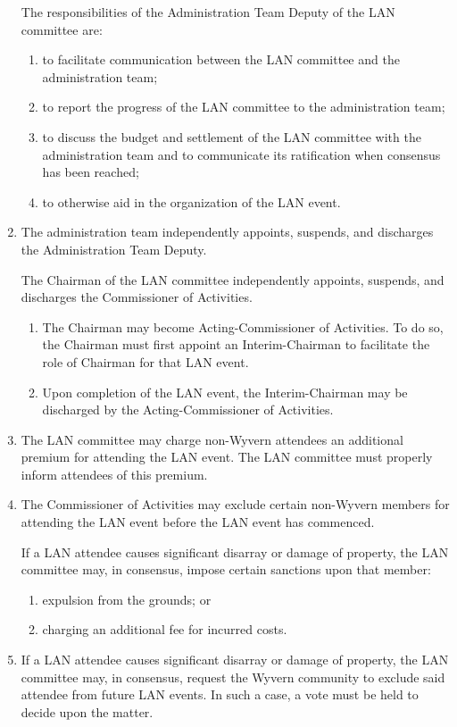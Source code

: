 \begin{enumerate}
    \begin{item}
        The responsibilities of the Administration Team Deputy of the LAN committee are:
        \begin{enumerate}
            \item to facilitate communication between the LAN committee and the administration team;
            \item to report the progress of the LAN committee to the administration team;
            \item to discuss the budget and settlement of the LAN committee with the administration team and to communicate its ratification when consensus has been reached;
            \item to otherwise aid in the organization of the LAN event.
        \end{enumerate}
    \end{item}

    \item The administration team independently appoints, suspends, and discharges the Administration Team Deputy.

    \begin{item}
        The Chairman of the LAN committee independently appoints, suspends, and discharges the Commissioner of Activities.
        \begin{enumerate}
            \item The Chairman may become Acting-Commissioner of Activities. To do so, the Chairman must first appoint an Interim-Chairman to facilitate the role of Chairman for that LAN event.
            \item Upon completion of the LAN event, the Interim-Chairman may be discharged by the Acting-Commissioner of Activities.
        \end{enumerate}
    \end{item}

    \item The LAN committee may charge non-Wyvern attendees an additional premium for attending the LAN event. The LAN committee must properly inform attendees of this premium.

    \item The Commissioner of Activities may exclude certain non-Wyvern members for attending the LAN event before the LAN event has commenced.
    
    \begin{item} If a LAN attendee causes significant disarray or damage of property, the LAN committee may, in consensus, impose certain sanctions upon that member:
        \begin{enumerate}
            \item expulsion from the grounds; or
            \item charging an additional fee for incurred costs.
        \end{enumerate}
    \end{item}
    
    \item If a LAN attendee causes significant disarray or damage of property, the LAN committee may, in consensus, request the Wyvern community to exclude said attendee from future LAN events. In such a case, a vote must be held to decide upon the matter.

\end{enumerate}
